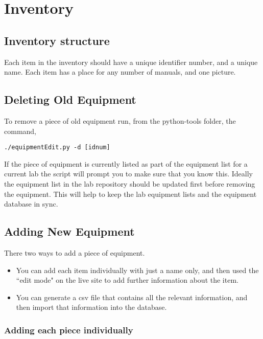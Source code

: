 \documentclass[justified]{book}
\begin{document}
\section{Inventory}

\subsection{Inventory structure}

Each item in the inventory should have a unique identifier number, and a unique name. Each item has a place for any number of manuals, and one picture. 


\subsection{Deleting Old Equipment}

To remove a piece of old equipment run, from the python-tools folder, the command,


\begin{lstlisting}
./equipmentEdit.py -d [idnum]       
\end{lstlisting}

If the piece of equipment is currently listed as part of the equipment list for a current lab the script will prompt you to make sure that you know this. Ideally the equipment list in the lab repository should be updated first before removing the equipment. This will help to keep the lab equipment lists and the equipment database in sync. 

\subsection{Adding New Equipment}

There two ways to add a piece of equipment. 
\begin{itemize}

\item You can add each item individually with just a name only, and then used the ``edit mode" on the live site to add further information about the item.

\item You can generate a csv file that contains all the relevant information, and then import that information into the database.
\end{itemize}

\subsubsection{Adding each piece individually}
\end{document}

